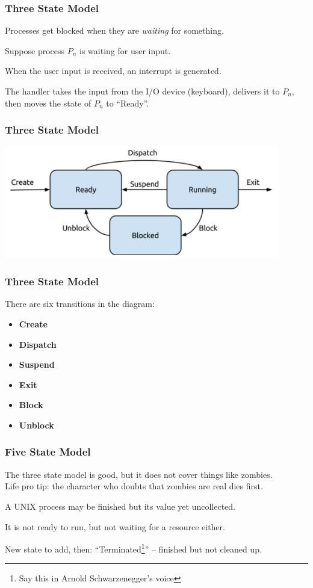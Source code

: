 \begin{frame}
\frametitle{Three State Model}

Processes get blocked when they are \textit{waiting} for something.

Suppose process $P_{n}$ is waiting for user input. 

When the user input is received, an interrupt is generated.

The handler takes the input from the I/O device (keyboard), delivers it to $P_{n}$, then moves the state of $P_{n}$ to ``Ready''.

\end{frame}

\begin{frame}
\frametitle{Three State Model}

\begin{center}
\includegraphics[width=0.9\textwidth]{images/3-state-model.png}
\end{center}


\end{frame}

\begin{frame}
\frametitle{Three State Model}

There are six transitions in the diagram:
\begin{itemize}
	\item \textbf{Create}
	\item \textbf{Dispatch}
	\item \textbf{Suspend}
	\item \textbf{Exit}
	\item \textbf{Block}
	\item \textbf{Unblock}
\end{itemize}

\end{frame}

\begin{frame}
\frametitle{Five State Model}

The three state model is good, but it does not cover things like zombies.\\
\quad Life pro tip: the character who doubts that zombies are real dies first.

A UNIX process may be finished but its value yet uncollected.

It is not ready to run, but not waiting for a resource either.

New state to add, then: ``Terminated\footnote{Say this in Arnold Schwarzenegger's voice}'' -- finished but not cleaned up.

\end{frame}

